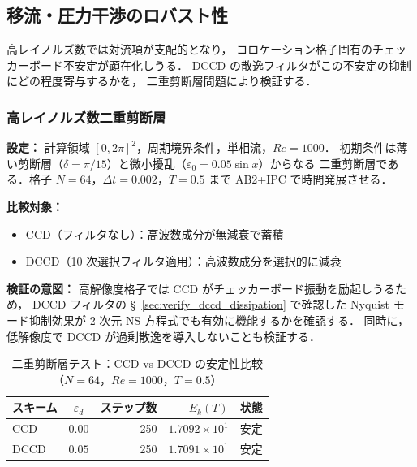 %
\subsection{移流・圧力干渉のロバスト性}
\label{sec:advection_pressure_coupling}

高レイノルズ数では対流項が支配的となり，
コロケーション格子固有のチェッカーボード不安定が顕在化しうる．
DCCD の散逸フィルタがこの不安定の抑制にどの程度寄与するかを，
二重剪断層問題により検証する．

\subsubsection{高レイノルズ数二重剪断層}
\label{sec:highre_dccd}

\textbf{設定：}
計算領域 $[0, 2\pi]^2$，周期境界条件，単相流，$\mathit{Re} = 1000$．
初期条件は薄い剪断層（$\delta = \pi/15$）と微小擾乱（$\varepsilon_0 = 0.05\sin x$）からなる
二重剪断層である．格子 $N = 64$，$\Delta t = 0.002$，$T = 0.5$ まで AB2+IPC で時間発展させる．

\textbf{比較対象：}
\begin{itemize}[noitemsep]
  \item CCD（フィルタなし）：高波数成分が無減衰で蓄積
  \item DCCD（10 次選択フィルタ適用）：高波数成分を選択的に減衰
\end{itemize}

\textbf{検証の意図：}
高解像度格子では CCD がチェッカーボード振動を励起しうるため，
DCCD フィルタの §~\ref{sec:verify_dccd_dissipation} で確認した
Nyquist モード抑制効果が 2 次元 NS 方程式でも有効に機能するかを確認する．
同時に，低解像度で DCCD が過剰散逸を導入しないことも検証する．

\begin{table}[htbp]
\centering
\caption{二重剪断層テスト：CCD vs DCCD の安定性比較（$N=64$，$\mathit{Re}=1000$，$T=0.5$）}
\label{tab:highre_dccd}
\begin{tabular}{lcrrc}
\toprule
スキーム & $\varepsilon_d$ & ステップ数 & $E_k(T)$ & 状態 \\
\midrule
CCD  & $0.00$ & 250 & $1.7092 \times 10^{1}$ & 安定 \\
DCCD & $0.05$ & 250 & $1.7091 \times 10^{1}$ & 安定 \\
\bottomrule
\end{tabular}
\end{table}

